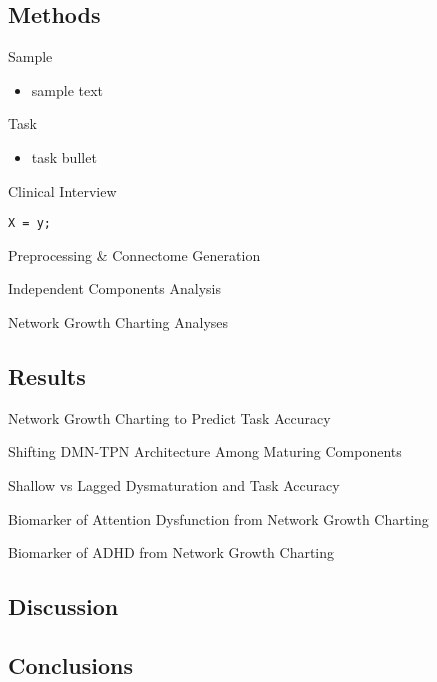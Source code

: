 \documentclass[presentation]{beamer}
\begin{document}
\subsection{Methods}
\label{sec:orgheadline11}
\begin{frame}[label={sec:orgheadline5}]{Sample}
\begin{itemize}
\item sample text
\end{itemize}
\end{frame}
\begin{frame}[label={sec:orgheadline6}]{Task}
\begin{itemize}
\item task bullet
\end{itemize}
\end{frame}
\begin{frame}[fragile,label={sec:orgheadline7}]{Clinical Interview}
 \begin{verbatim}
X = y;
\end{verbatim}
\end{frame}
\begin{frame}[label={sec:orgheadline8}]{Preprocessing \& Connectome Generation}
\end{frame}
\begin{frame}[label={sec:orgheadline9}]{Independent Components Analysis}
\end{frame}
\begin{frame}[label={sec:orgheadline10}]{Network Growth Charting Analyses}
\end{frame}
\subsection{Results}
\label{sec:orgheadline17}
\begin{frame}[label={sec:orgheadline12}]{Network Growth Charting to Predict Task Accuracy}
\end{frame}
\begin{frame}[label={sec:orgheadline13}]{Shifting DMN-TPN Architecture Among Maturing Components}
\end{frame}
\begin{frame}[label={sec:orgheadline14}]{Shallow vs Lagged Dysmaturation and Task Accuracy}
\end{frame}
\begin{frame}[label={sec:orgheadline15}]{Biomarker of Attention Dysfunction from Network Growth Charting}
\end{frame}
\begin{frame}[label={sec:orgheadline16}]{Biomarker of ADHD from Network Growth Charting}
\end{frame}
\subsection{Discussion}
\label{sec:orgheadline18}
\subsection{Conclusions}
\label{sec:orgheadline19}
\end{document}
